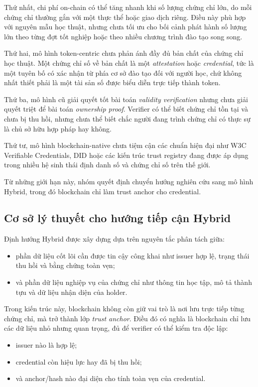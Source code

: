 Thứ nhất, chi phí on-chain có thể tăng nhanh khi số lượng chứng chỉ lớn, do mỗi chứng chỉ thường gắn với một thực thể hoặc giao dịch riêng. Điều này phù hợp với nguyên mẫu học thuật, nhưng chưa tối ưu cho bối cảnh phát hành số lượng lớn theo từng đợt tốt nghiệp hoặc theo nhiều chương trình đào tạo song song.

Thứ hai, mô hình token-centric chưa phản ánh đầy đủ bản chất của chứng chỉ học thuật. Một chứng chỉ số về bản chất là một \textit{attestation} hoặc \textit{credential}, tức là một tuyên bố có xác nhận từ phía cơ sở đào tạo đối với người học, chứ không nhất thiết phải là một tài sản số được biểu diễn trực tiếp thành token.

Thứ ba, mô hình cũ giải quyết tốt bài toán \textit{validity verification} nhưng chưa giải quyết triệt để bài toán \textit{ownership proof}. Verifier có thể biết chứng chỉ tồn tại và chưa bị thu hồi, nhưng chưa thể biết chắc người đang trình chứng chỉ có thực sự là chủ sở hữu hợp pháp hay không.

Thứ tư, mô hình blockchain-native chưa tiệm cận các chuẩn hiện đại như W3C Verifiable Credentials, DID hoặc các kiến trúc trust registry đang được áp dụng trong nhiều hệ sinh thái định danh số và chứng chỉ số trên thế giới.

Từ những giới hạn này, nhóm quyết định chuyển hướng nghiên cứu sang mô hình Hybrid, trong đó blockchain chỉ làm trust anchor cho credential.

\subsection{Cơ sở lý thuyết cho hướng tiếp cận Hybrid}

Định hướng Hybrid được xây dựng dựa trên nguyên tắc phân tách giữa:
\begin{itemize}
    \item phần dữ liệu cốt lõi cần được tin cậy công khai như issuer hợp lệ, trạng thái thu hồi và bằng chứng toàn vẹn;
    \item và phần dữ liệu nghiệp vụ của chứng chỉ như thông tin học tập, mô tả thành tựu và dữ liệu nhận diện của holder.
\end{itemize}

Trong kiến trúc này, blockchain không còn giữ vai trò là nơi lưu trực tiếp từng chứng chỉ, mà trở thành lớp \textit{trust anchor}. Điều đó có nghĩa là blockchain chỉ lưu các dữ liệu nhỏ nhưng quan trọng, đủ để verifier có thể kiểm tra độc lập:
\begin{itemize}
    \item issuer nào là hợp lệ;
    \item credential còn hiệu lực hay đã bị thu hồi;
    \item và anchor/hash nào đại diện cho tính toàn vẹn của credential.
\end{itemize}


